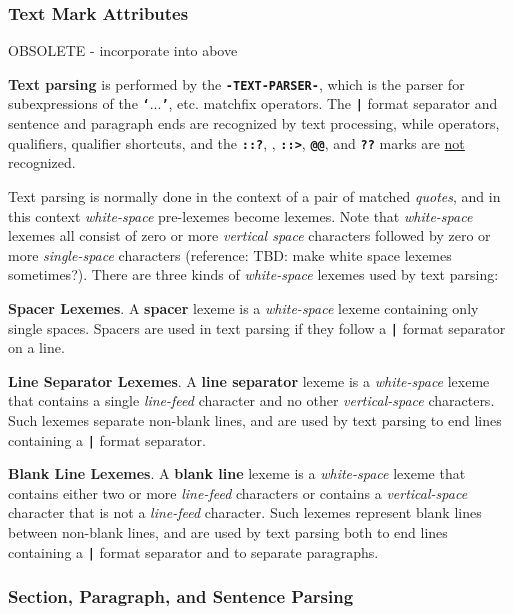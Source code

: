 \documentclass[12pt]{article}
\newcommand{\TT}[1]{{\tt \bfseries #1}}
\newcommand{\key}[1]{{\rm \bfseries #1}}
\newcommand{\ttkey}[1]{{\tt \bfseries #1}}
\begin{document}
\subsubsection{Text Mark Attributes}
\label{TEXT-MARK-ATTRIBUTES}

OBSOLETE - incorporate into above

\key{Text parsing} is performed by the \ttkey{-TEXT-PARSER-},
which is the parser for subexpressions of the
\TT{`}...\TT{'}, etc. matchfix operators.
The \TT{|} format separator and sentence and paragraph ends are
recognized by text processing, while
operators, qualifiers, qualifier shortcuts, and
the \TT{::?}, \TT{<:>}, \TT{::>}, \TT{@@}, and
\TT{??} marks are \underline{not} recognized.

Text parsing is normally done in the context of a pair of matched
{\em quotes}, and in this context {\em white-space} pre-lexemes
become lexemes.  Note that {\em white-space} lexemes all consist
of zero or more {\em vertical space} characters followed by zero or
more {\em single-space} characters (reference: TBD: make white space
lexemes sometimes?).
There are three kinds of {\em white-space} lexemes
used by text parsing:

\begin{list}{}{}

\item[{\bf Spacer Lexemes}.]
A \key{spacer} lexeme is a {\em white-space} lexeme containing
only single spaces.  Spacers are used in text parsing if they follow
a \TT{|} format separator on a line.

\item[{\bf Line Separator Lexemes}.]
A \key{line separator} lexeme is a {\em white-space}
lexeme that contains a single {\em line-feed} character and no other
{\em vertical-space} characters.  Such lexemes separate
non-blank lines, and are used by text parsing to end lines containing
a \TT{|} format separator.

\item[{\bf Blank Line Lexemes}.]
A \key{blank line} lexeme is a {\em white-space}
lexeme that contains either two or more {\em line-feed} characters or contains
a {\em vertical-space} character that is not a {\em line-feed} character.
Such lexemes
represent blank lines between non-blank lines, and are used by text parsing
both to end lines containing a \TT{|} format separator and
to separate paragraphs.

\end{list}

\subsubsection{Section, Paragraph, and Sentence Parsing}
\label{SECTION-PARAGRAPH-AND-SENTENCE-PARSING}
\end{document}
